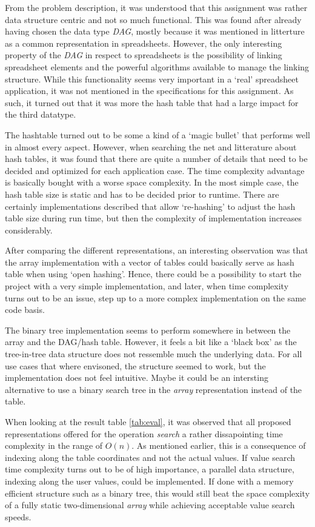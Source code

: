 \documentclass[a4paper,11pt,twoside]{article}
\begin{document}
From the problem description, it was understood that this assignment
was rather data structure centric and not so much functional. This was
found after already having chosen the data type \textit{DAG}, mostly 
because it was mentioned in litterture as a common representation in
spreadsheets. However, the only interesting property of the
\textit{DAG} in respect to spreadsheets is the possibility of linking
spreadsheet elements and the powerful algorithms available to manage
the linking structure. While this functionality seems very important
in a `real' spreadsheet application, it was  not mentioned in the
specifications for this assignment. As such, it turned out that it was
more the hash table that had a large impact for the third datatype.

The hashtable turned out to be some a kind of a `magic bullet' that performs
well in almost every aspect. However, when searching the net
and litterature about hash tables, it was found that there are quite a
number of details that need to be decided and optimized for each
application case. The time complexity advantage is basically bought
with a worse space complexity. In the most simple case, the hash table
size is static and has to be decided prior to runtime. There are certainly
implementations described that allow `re-hashing' to adjust the hash
table size during run time, but then the complexity of implementation
increases considerably.

After comparing the different representations, an interesting
observation was that the array implementation with a vector of tables
could basically serve as hash table when using `open hashing'. Hence,
there could be a possibility to start the project with a very simple
implementation, and later, when time complexity turns out to be an
issue, step up to a more complex implementation on the same
code basis. 

The binary tree implementation seems to perform somewhere in between
the array and the DAG/hash table. However, it feels a bit like a `black
box' as the tree-in-tree  data structure does not ressemble much the
underlying data. For all use cases that where envisoned, the structure
seemed to work, but the implementation does not feel intuitive. Maybe
it could be an intersting alternative to use a binary search tree in
the \textit{array} representation instead of the table.

When looking at the result table \ref{tab:eval}, it was observed that
all proposed representations offered for the operation \textit{search}
a rather dissapointing time complexity in the range of $O(n)$. As
mentioned earlier, this is a consequence of indexing along the table
coordinates and not the actual values. If value search time complexity
turns out to be of high importance, a parallel data structure, indexing
along the user values, could be implemented. If done with a memory efficient
structure such as a binary tree, this would still beat the space
complexity of a fully static two-dimensional \textit{array} while
achieving acceptable value search speeds.
\end{document}

